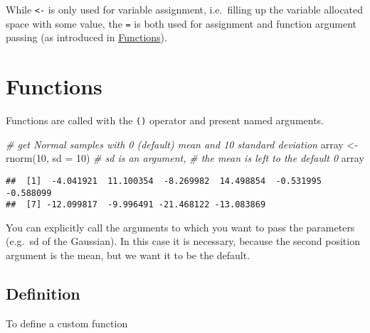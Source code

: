 \documentclass[
  oneside]{book}
\newenvironment{Shaded}{\begin{snugshade}}{\end{snugshade}}
\newcommand{\AttributeTok}[1]{\textcolor[rgb]{0.77,0.63,0.00}{#1}}
\newcommand{\CommentTok}[1]{\textcolor[rgb]{0.56,0.35,0.01}{\textit{#1}}}
\newcommand{\DecValTok}[1]{\textcolor[rgb]{0.00,0.00,0.81}{#1}}
\newcommand{\FunctionTok}[1]{\textcolor[rgb]{0.00,0.00,0.00}{#1}}
\newcommand{\NormalTok}[1]{#1}
\newcommand{\OtherTok}[1]{\textcolor[rgb]{0.56,0.35,0.01}{#1}}
\begin{document}
While \texttt{\textless{}-} is only used for variable assignment, i.e.~filling up the variable
allocated space with some value, the \texttt{=} is both used for assignment and
function argument passing (as introduced in \protect\hyperlink{functions}{Functions}).

\hypertarget{functions}{%
\section{Functions}\label{functions}}

Functions are called with the \texttt{()} operator and present named arguments.

\begin{Shaded}
\begin{Highlighting}[]
\CommentTok{\# get Normal samples with 0 (default) mean and 10 standard deviation}
\NormalTok{array }\OtherTok{\textless{}{-}} \FunctionTok{rnorm}\NormalTok{(}\DecValTok{10}\NormalTok{, }\AttributeTok{sd =} \DecValTok{10}\NormalTok{) }\CommentTok{\# sd is an argument,}
                            \CommentTok{\# the mean is left to the default 0}
\NormalTok{array}
\end{Highlighting}
\end{Shaded}

\begin{verbatim}
##  [1]  -4.041921  11.100354  -8.269982  14.498854  -0.531995  -0.588099
##  [7] -12.099817  -9.996491 -21.468122 -13.083869
\end{verbatim}

You can explicitly call the arguments to which you want to pass the parameters
(e.g.~sd of the Gaussian). In this case it is necessary, because the second
position argument is the mean, but we want it to be the default.

\hypertarget{definition}{%
\subsection{Definition}\label{definition}}

To define a custom function
\end{document}
